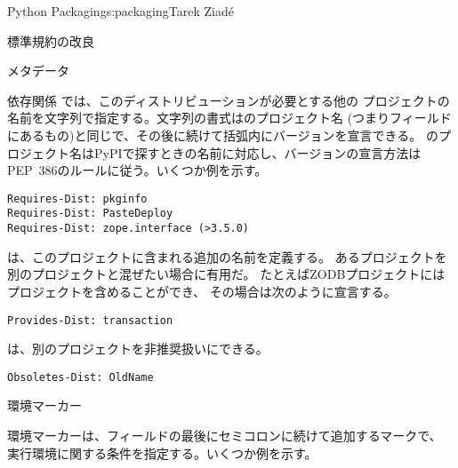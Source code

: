 \begin{aosachapter}{Python Packaging}{s:packaging}{Tarek Ziad\'{e}}
\begin{aosasect1}{標準規約の改良}
\begin{aosasect2}{メタデータ}
\begin{aosasect3}{依存関係}
では、このディストリビューションが必要とする他の
プロジェクトの名前を文字列で指定する。文字列の書式はのプロジェクト名
(つまりフィールドにあるもの)と同じで、その後に続けて括弧内にバージョンを宣言できる。
のプロジェクト名はPyPIで探すときの名前に対応し、バージョンの宣言方法は
PEP~386のルールに従う。いくつか例を示す。

\begin{verbatim}
Requires-Dist: pkginfo
Requires-Dist: PasteDeploy
Requires-Dist: zope.interface (>3.5.0)
\end{verbatim}

\noindent
{}は、このプロジェクトに含まれる追加の名前を定義する。
あるプロジェクトを別のプロジェクトと混ぜたい場合に有用だ。
たとえばZODBプロジェクトにはプロジェクトを含めることができ、
その場合は次のように宣言する。

\begin{verbatim}
Provides-Dist: transaction
\end{verbatim}

\noindent
{}は、別のプロジェクトを非推奨扱いにできる。

\begin{verbatim}
Obsoletes-Dist: OldName
\end{verbatim}

\end{aosasect3}

\begin{aosasect3}{環境マーカー}

環境マーカーは、フィールドの最後にセミコロンに続けて追加するマークで、
実行環境に関する条件を指定する。いくつか例を示す。


\end{aosasect3}
\end{aosasect2}
\end{aosasect1}
\end{aosachapter}
